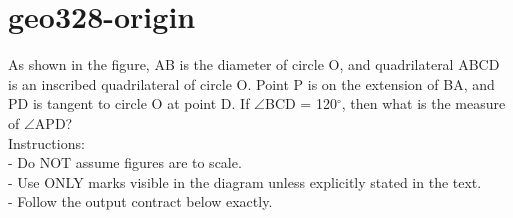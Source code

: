 \documentclass[12pt]{article}
\begin{document}
\section*{geo328-origin}
\noindent\begin{minipage}{\textwidth}
\setlength{\parskip}{4pt}
As shown in the figure, AB is the diameter of circle O, and quadrilateral ABCD is an inscribed quadrilateral of circle O. Point P is on the extension of BA, and PD is tangent to circle O at point D. If \ensuremath{\angle }BCD = 120\ensuremath{^\circ}, then what is the measure of \ensuremath{\angle }APD?\\
Instructions:\\
- Do NOT assume figures are to scale.\\
- Use ONLY marks visible in the diagram unless explicitly stated in the text.\\
- Follow the output contract below exactly.\\
\end{minipage}
\end{document}
